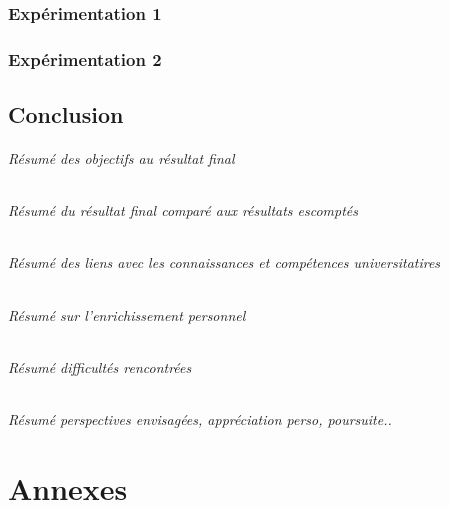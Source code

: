 \documentclass[
	headsepline=on,
	footsepline=on,
	twoside=off,
	abstract=on,
	DIV=10
]{scrreprt}
\begin{document}
			\section{Expérimentation 1}
			\section{Expérimentation 2}
			
			
		\chapter{Conclusion}
			\paragraph{Résumé des objectifs au résultat final}
			
			\paragraph{Résumé du résultat final comparé aux résultats escomptés}
			
			\paragraph{Résumé des liens avec les connaissances et compétences universitatires}
			
			\paragraph{Résumé sur l'enrichissement personnel}
			
			\paragraph{Résumé difficultés rencontrées}
			
			\paragraph{Résumé perspectives envisagées, appréciation perso, poursuite..}
		
			\cleardoublepage
			\pagebreak
			
		\part{Annexes}
			
			\begin{thebibliography}{}
			\end{thebibliography}
	
\end{document}
